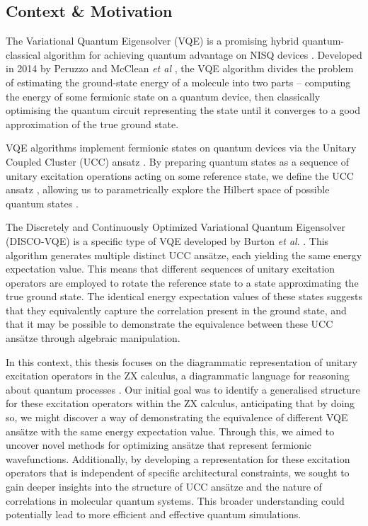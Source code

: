 \subsection{Context \& Motivation}%
\label{context-motivation}

The Variational Quantum Eigensolver (VQE) is a promising hybrid quantum-classical algorithm for achieving quantum advantage on NISQ devices \cite{Cerezo2020}. Developed in 2014 by Peruzzo and McClean \textit{et al} \cite{Peruzzo2014}, the VQE algorithm divides the problem of estimating the ground-state energy of a molecule into two parts -- computing the energy of some fermionic state on a quantum device, then classically optimising the quantum circuit representing the state until it converges to a good approximation of the true ground state.

VQE algorithms implement fermionic states on quantum devices via the Unitary Coupled Cluster (UCC) ansatz \cite{Taube2006}. By preparing quantum states as a sequence of unitary excitation operations acting on some reference state, we define the UCC ansatz \cite{Burton2023}, allowing us to parametrically explore the Hilbert space of possible quantum states \cite{McClean2016}.

The Discretely and Continuously Optimized Variational Quantum Eigensolver (DISCO-VQE) is a specific type of VQE developed by Burton \textit{et al}. \cite{Burton2023}. This algorithm generates multiple distinct UCC ansätze, each yielding the same energy expectation value. This means that different sequences of unitary excitation operators are employed to rotate the reference state to a state approximating the true ground state. The identical energy expectation values of these states suggests that they equivalently capture the correlation present in the ground state, and that it may be possible to demonstrate the equivalence between these UCC ansätze through algebraic manipulation.

In this context, this thesis focuses on the diagrammatic representation of unitary excitation operators in the ZX calculus, a diagrammatic language for reasoning about quantum processes \cite{Coecke2011}. Our initial goal was to identify a generalised structure for these excitation operators within the ZX calculus, anticipating that by doing so, we might discover a way of demonstrating the equivalence of different VQE ansätze with the same energy expectation value. Through this, we aimed to uncover novel methods for optimizing ansätze that represent fermionic wavefunctions. Additionally, by developing a representation for these excitation operators that is independent of specific architectural constraints, we sought to gain deeper insights into the structure of UCC ansätze and the nature of correlations in molecular quantum systems. This broader understanding could potentially lead to more efficient and effective quantum simulations.

